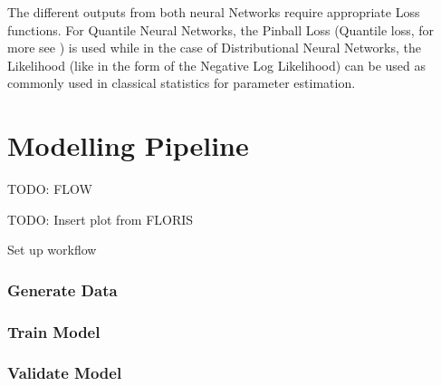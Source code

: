The different outputs from both neural Networks require appropriate Loss functions. For Quantile Neural Networks, the Pinball Loss (Quantile loss, for more see \cite{Steinwart_2011}) is used while in the case of Distributional Neural Networks, the Likelihood (like in the form of the Negative Log Likelihood)  can be used as commonly used in classical statistics for parameter estimation. 

\cite{Akpabio} \cite{Marcjasz_2023}

\section{Modelling Pipeline}

TODO: FLOW

TODO: Insert plot from FLORIS

Set up workflow

\subsubsection{Generate Data}

\subsubsection{Train Model}

\subsubsection{Validate Model}
